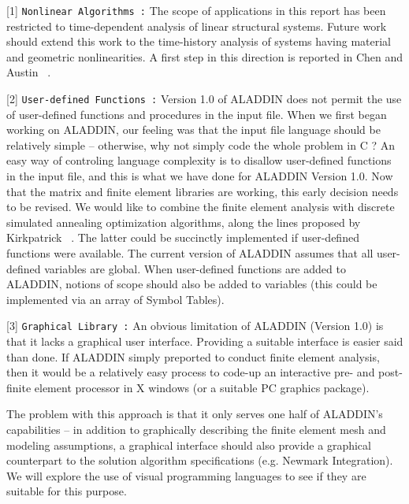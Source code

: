 \begin{description}
\item{[1]}
{\tt Nonlinear Algorithms :}
The scope of applications in this report has been restricted 
to time-dependent analysis of linear structural systems.
Future work should extend this work to the time-history analysis of systems
having material and geometric nonlinearities.
A first step in this direction is reported in Chen and Austin ~\cite{chen95}.

\item{[2]}
{\tt User-defined Functions :}
Version 1.0 of ALADDIN does not permit the use of
user-defined functions and procedures in the input file.
When we first began working on ALADDIN,
our feeling was that the input file language should be
relatively simple -- otherwise, why not simply code the whole problem in C ?
An easy way of controling language complexity
is to disallow user-defined functions in the input file,
and this is what we have done for ALADDIN Version 1.0.
Now that the matrix and finite element libraries are working,
this early decision needs to be revised.
We would like to combine the finite element
analysis with discrete simulated annealing optimization algorithms,
along the lines proposed by Kirkpatrick ~\cite{kirkpatrick83}.
The latter could be succinctly implemented if user-defined functions were available. 
The current version of ALADDIN assumes that all user-defined
variables are global.  When user-defined functions are added to ALADDIN,
notions of scope should also be added to variables (this
could be implemented via an array of Symbol Tables).

\item{[3]}
{\tt Graphical Library :}
An obvious limitation of ALADDIN (Version 1.0) is that it
lacks a graphical user interface. Providing a suitable interface
is easier said than done. If ALADDIN simply preported to conduct
finite element analysis, then it would be a relatively easy
process to code-up an interactive pre- and post-finite
element processor in X windows (or a suitable PC graphics package).

The problem with this approach is that it only serves one
half of ALADDIN's capabilities -- in addition to
graphically describing the finite element mesh and modeling
assumptions, a graphical interface should also provide a graphical
counterpart to the solution algorithm specifications (e.g. Newmark Integration).
We will explore the use of visual programming languages
to see if they are suitable for this purpose.


\end{description}

